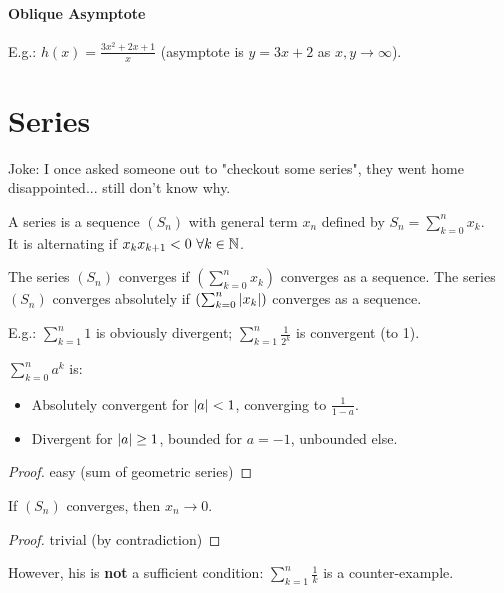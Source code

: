 \paragraph{Oblique Asymptote}
E.g.: $h(x) = \frac{3x^2+2x+1}{x}$ (asymptote is $y=3x+2$ as $x,y \to \infty$).



\section{Series}
Joke: I once asked someone out to "checkout some series", they went home disappointed... still don't know why.
\begin{definition}[Series]
	A series is a sequence $(S_n)$ with general term $x_n$ defined by $S_n = \sum_{k=0}^{n} x_k$.\\
	It is alternating if $x_k x_{k+1} < 0 \ \forall k \in \N$.
\end{definition}
\begin{definition}
	The series $(S_n)$ converges if $\left( \sum_{k=0}^{n} x_k \right)$ converges as a sequence.
	The series $(S_n)$ converges absolutely if $\left( \sum_{k=0}^{n} | x_k | \right)$ converges as a sequence.
\end{definition}
E.g.: $\sum_{k=1}^n 1$ is obviously divergent;
$\sum_{k=1}^n \frac{1}{2^k}$ is convergent (to 1).

\begin{property}
	$\sum_{k=0}^n a^k$ is:
	\begin{itemize}
		\item Absolutely convergent for $| a | < 1$, converging to $\frac{1}{1-a}$.
		\item Divergent for $| a | \geq 1$, bounded for $a=-1$, unbounded else.
	\end{itemize}
\end{property}
\begin{proof}
	easy (sum of geometric series)
\end{proof}

\begin{property}
	If $(S_n)$ converges, then $x_n \to 0$.
\end{property}
\begin{proof}
	trivial (by contradiction)
\end{proof}
However, his is \textbf{not} a sufficient condition: $\sum_{k=1}^n \frac{1}{k}$ is a counter-example.


